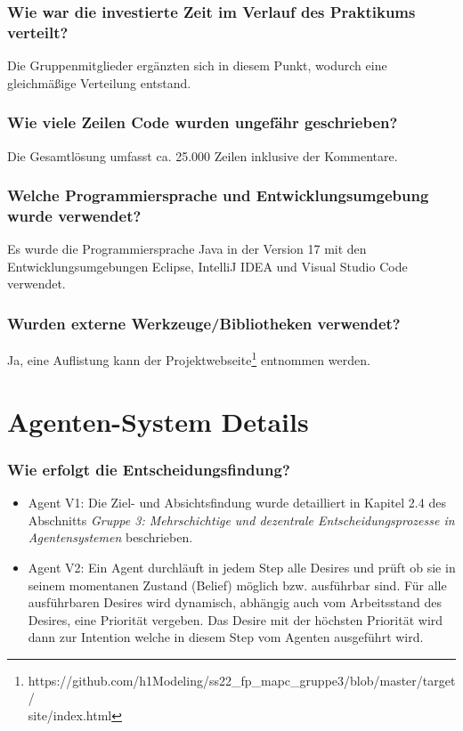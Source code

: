 \documentclass[runningheads]{llncs}
\newcommand{\refMain}{{\textit{Gruppe 3: Mehrschichtige und dezentrale Entscheidungsprozesse in Agentensystemen }}}
\begin{document}
	\subsubsection{Wie war die investierte Zeit im Verlauf des Praktikums verteilt?\\}
	Die Gruppenmitglieder ergänzten sich in diesem Punkt, wodurch eine gleichmäßige Verteilung entstand.
	\subsubsection{Wie viele Zeilen Code wurden ungefähr geschrieben?\\}
	Die Gesamtlösung umfasst ca. 25.000 Zeilen inklusive der Kommentare.
	\subsubsection{Welche Programmiersprache und Entwicklungsumgebung wurde verwendet?\\}
	Es wurde die Programmiersprache Java in der Version 17 mit den Entwicklungsumgebungen Eclipse, IntelliJ IDEA und Visual Studio Code verwendet.
	\subsubsection{Wurden externe Werkzeuge/Bibliotheken verwendet?\\}
	Ja, eine Auflistung kann der Projektwebseite\footnote{https://github.com/h1Modeling/ss22\_fp\_mapc\_gruppe3/blob/master/target/ \\site/index.html} entnommen werden.
	\section{Agenten-System Details}
	\subsubsection{Wie erfolgt die Entscheidungsfindung?}
	\begin{itemize}
		\item Agent V1: Die Ziel- und Absichtsfindung wurde detailliert in Kapitel 2.4 des Abschnitts \refMain beschrieben. \\
		\item Agent V2: Ein Agent durchläuft in jedem Step alle Desires und prüft ob sie in seinem momentanen Zustand (Belief) möglich bzw. ausführbar sind. Für alle ausführbaren Desires wird dynamisch, abhängig auch vom Arbeitsstand des Desires, eine Priorität vergeben. Das Desire mit der höchsten Priorität wird dann zur Intention welche in diesem Step vom Agenten ausgeführt wird.
	\end{itemize}
	
\end{document}
